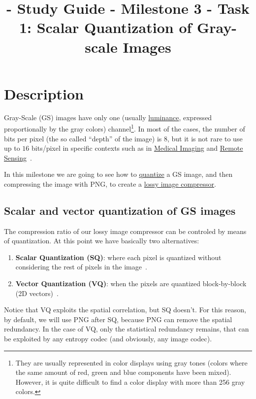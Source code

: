 

\title{\SM{} - Study Guide - Milestone 3 - Task 1: Scalar Quantization of Gray-scale Images}

\maketitle
\tableofcontents

\section{Description}

Gray-Scale (GS) images have only one (usually
\href{https://en.wikipedia.org/wiki/Luminance}{luminance}, expressed
proportionally by the gray colors) channel\footnote{They are usually
represented in color displays using gray tones (colors where the same
amount of red, green and blue components have been mixed). However, it
is quite difficult to find a color display with more than 256 gray
colors.}. In most of the cases, the number of bits per pixel (the so
called ``depth'' of the image) is $8$, but it is not rare to use up to
$16$ bits/pixel in specific contexts such as in
\href{https://en.wikipedia.org/wiki/Medical_imaging}{Medical Imaging}
and \href{https://en.wikipedia.org/wiki/Remote_sensing}{Remote
  Sensing}~\cite{burger2016digital}.

In this milestone we are going to see how to
\href{https://vicente-gonzalez-ruiz.github.io/quantization/}{quantize}
a GS image, and then compressing the image with PNG, to create a
\href{https://en.wikipedia.org/wiki/Lossy_compression}{lossy image
  compressor}.

\subsection{Scalar and vector quantization of GS images}

The compression ratio of our lossy image compressor can be controled
by means of quantization. At this point we have basically two
alternatives:
\begin{enumerate}
\item \textbf{Scalar Quantization (SQ)}: where each pixel is quantized
  without considering the rest of pixels in the
  image~\cite{vruiz__scalar_quantization}.
\item \textbf{Vector Quantization (VQ)}: when the pixels are quantized
  block-by-block (2D vectors)~\cite{vruiz__vector_quantization}.
\end{enumerate}
Notice that VQ exploits the spatial correlation, but SQ doesn't. For
this reason, by default, we will use PNG after SQ, because PNG can
remove the spatial redundancy. In the case of VQ, only the statistical
redundancy remains, that can be exploited by any entropy codec (and
obviously, any image codec).

